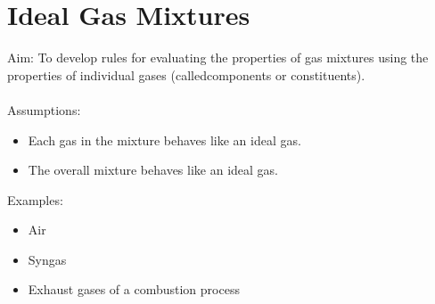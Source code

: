 \documentclass[class=report, crop=false, 12pt,a4paper]{standalone}
\numberwithin{equation}{section}
\begin{document}
\section{Ideal Gas Mixtures}
Aim: To develop rules for evaluating the properties of gas mixtures using the properties of individual gases (calledcomponents or constituents). \\\\
Assumptions:
\begin{itemize}[noitemsep]
  \item Each gas in the mixture behaves like an ideal gas.
  \item The overall mixture behaves like an ideal gas.
\end{itemize}
Examples:
\begin{itemize}[noitemsep]
  \item Air
  \item Syngas
  \item Exhaust gases of a combustion process
\end{itemize}
\end{document}
